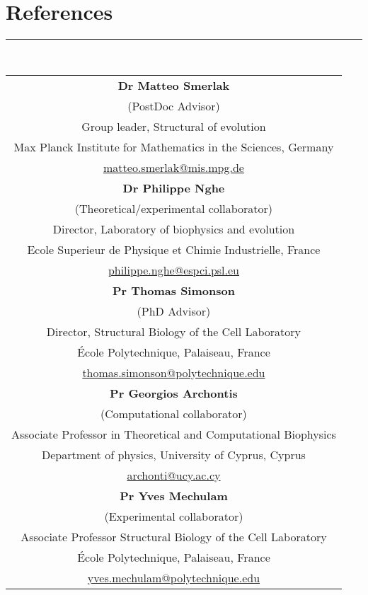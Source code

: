 \documentclass[5pt]{article}
\begin{document}
\section*{References}
\hrule height 0.5pt \\%
\vspace{5pt}
\centering
\begin{tabular}{c}
  {\bf Dr Matteo Smerlak}\\
  (PostDoc Advisor)\\
  Group leader, Structural of evolution\\
  Max Planck Institute for Mathematics in the Sciences, Germany\\
  \url{matteo.smerlak@mis.mpg.de}\\[5pt]

  {\bf Dr Philippe Nghe}\\
  (Theoretical/experimental collaborator)\\
  Director, Laboratory of biophysics and evolution\\
  Ecole Superieur de Physique et Chimie Industrielle, France\\
  \url{philippe.nghe@espci.psl.eu}\\[5pt]

  {\bf Pr Thomas Simonson}\\
  (PhD Advisor)\\
  Director, Structural Biology of the Cell Laboratory\\
  École Polytechnique, Palaiseau, France\\
  \url{thomas.simonson@polytechnique.edu}\\[5pt]

  {\bf Pr Georgios Archontis}\\
  (Computational collaborator)\\
  Associate Professor in Theoretical and Computational Biophysics\\
  Department of physics, University of Cyprus, Cyprus\\
  \url{archonti@ucy.ac.cy}\\[5pt]

  {\bf Pr Yves Mechulam}\\
  (Experimental collaborator)\\
  Associate Professor Structural Biology of the Cell Laboratory\\
  École Polytechnique, Palaiseau, France\\
  \url{yves.mechulam@polytechnique.edu}
\end{tabular}
\end{document}

